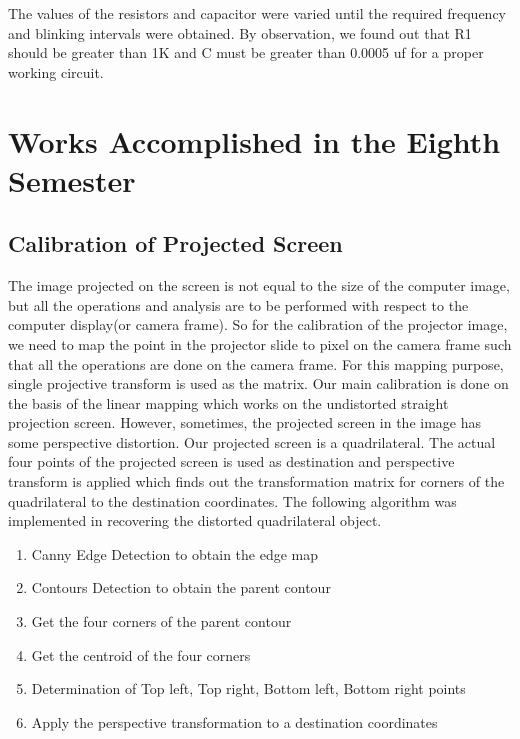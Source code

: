 \documentclass[12pt, a4paper]{article}
\begin{document}
	The values of the resistors and capacitor were varied until the required frequency and blinking intervals were obtained.
	By observation, we found out that R1 should be greater than 1K and C must be greater than 0.0005 uf for a proper working circuit.


\newpage

\section{Works Accomplished in the Eighth Semester}
	
\subsection{Calibration of Projected Screen}
	The image projected on the screen is not equal to the size of the computer image, but all the operations and analysis are to be performed with respect to the computer display(or camera frame). So for the calibration of the projector image, we need to map the point in the projector slide to pixel on the camera frame such that all the operations are done on the camera frame. For this mapping purpose, single projective transform is used as the matrix. Our main calibration is done on the basis of the linear mapping which works on the undistorted straight projection screen.
	However, sometimes, the projected screen in the image has some perspective distortion. Our projected screen is a quadrilateral. The actual four points of the projected screen is used as destination and perspective transform is applied which finds out the transformation matrix for corners of the quadrilateral to the destination coordinates. The following algorithm was implemented in recovering the distorted quadrilateral object.
\begin{enumerate}
\item Canny Edge Detection to obtain the edge map
\item Contours Detection to obtain the parent contour
\item Get the four corners of the parent contour
\item Get the centroid of the four corners
\item Determination of Top left, Top right, Bottom left, Bottom right points
\item Apply the perspective transformation to a destination coordinates
\end{enumerate}
	
\end{document}
